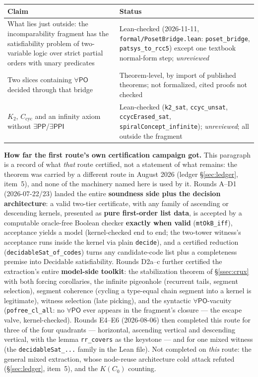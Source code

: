 \documentclass[11pt]{article}
\newcommand{\PO}{\ensuremath{\mathsf{PO}}}
\newcommand{\PP}{\ensuremath{\mathsf{PP}}}
\newcommand{\PPI}{\ensuremath{\mathsf{PPI}}}
\newcommand{\code}[1]{\texttt{#1}}
\begin{document}
\begin{center}
\small
\begin{tabular}{@{}>{\raggedright\arraybackslash}p{}>{\raggedright\arraybackslash}p{}@{}}
\toprule
\textbf{Claim} & \textbf{Status}\\
\midrule
What lies just outside: the incomparability fragment has the satisfiability
problem of two-variable logic over strict partial orders with unary predicates
& Lean-checked (2026-11-11, \code{formal/PosetBridge.lean}:
\code{poset\_bridge}, \code{patsys\_to\_rcc5}) except one textbook normal-form
step; \emph{unreviewed}\\[0.3em]
Two slices containing $\forall\PO$ decided through that bridge & Theorem-level,
by import of published theorems; not formalized, cited proofs not checked\\[0.3em]
$K_2$, $C_{\mathrm{cyc}}$ and an infinity axiom without
$\exists\PP$/$\exists\PPI$ & Lean-checked (\code{k2\_sat}, \code{ccyc\_unsat},
\code{ccycErased\_sat}, \code{spiralConcept\_infinite}); \emph{unreviewed};
all outside the fragment\\
\bottomrule
\end{tabular}
\end{center}

\textbf{How far the first route's own certification campaign got.} This
paragraph is a record of what \emph{that} route certified, not a statement of
what remains: the theorem was carried by a different route in August 2026
(ledger \S\ref{sec:ledger}, item~5), and none of the machinery named here is
used by it. Rounds A--D1 (2026-07-22/23) landed the entire \textbf{soundness
side plus the decision architecture}: a valid two-tier certificate, with any
family of ascending or descending kernels, presented as \textbf{pure
first-order list data}, is accepted by a computable oracle-free
Boolean checker \textbf{exactly when valid} (\code{mtOkB\_iff}),
acceptance yields a model (kernel-checked end to end; the two-tower
witness's acceptance runs inside the kernel via plain \code{decide}),
and a certified reduction (\code{decidableSat\_of\_codes}) turns any
candidate-code list plus a completeness premise into
$\mathrm{Decidable}$ satisfiability. Rounds D2a--c further certified
the extraction's entire \textbf{model-side toolkit}: the stabilization
theorem of \S\ref{ssec:crux} with both forcing corollaries, the
infinite pigeonhole (recurrent tails, segment selection), segment
coherence (cycling a type-equal chain segment into a kernel is
legitimate), witness selection (late picking), and the syntactic
$\forall\PO$-vacuity (\code{pofree\_cl\_all}: no $\forall\PO$ ever
appears in the fragment's closure --- the escape valve,
kernel-checked). Rounds E4--E6 (2026-08-06) then completed this route for
three of the four quadrants --- horizontal, ascending vertical and descending
vertical, with the lemma \code{rr\_covers} as the keystone --- and for one
mixed witness (the \code{decidableSat\_...} family in the Lean file). Not completed on
\emph{this} route: the general mixed extraction, whose node-reuse architecture
cold attack refuted (\S\ref{sec:ledger}, item~5), and the $K(C_0)$ counting.
\end{document}
